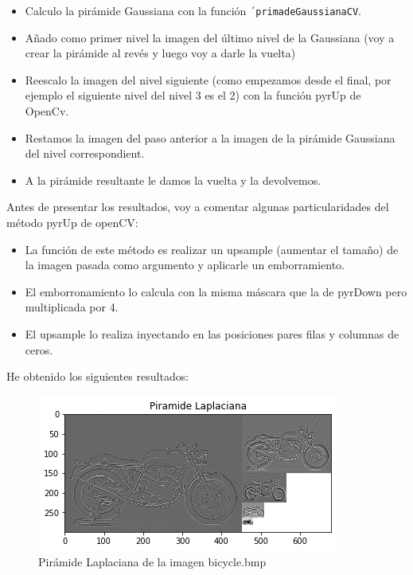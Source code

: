 \documentclass[12pt,spanish]{article}
\begin{document}
\begin{itemize}
	\item Calculo la pirámide Gaussiana con la función \texttt{´primadeGaussianaCV}.
	\item Añado como primer nivel la imagen del último nivel de la Gaussiana (voy a crear la pirámide al revés y luego voy a darle la vuelta)
	\item Reescalo la imagen del nivel siguiente (como empezamos desde el final, por ejemplo el siguiente nivel del nivel 3 es el 2) con la función pyrUp de OpenCv.
	\item Restamos la imagen del paso anterior a la imagen de la pirámide Gaussiana del nivel correspondient.
	\item A la pirámide resultante le damos la vuelta y la devolvemos.
\end{itemize}

Antes de presentar los resultados, voy a comentar algunas particularidades del método pyrUp de openCV:

\begin{itemize}
	\item La función de este método es realizar un upsample (aumentar el tamaño) de la imagen pasada como argumento y aplicarle un emborramiento.
	\item El emborronamiento lo calcula con la misma máscara que la de pyrDown pero multiplicada por 4.
	\item El upsample lo realiza inyectando en las posiciones pares filas y columnas de ceros.
\end{itemize}


He obtenido los siguientes resultados:

\begin{figure}[H]
	\includegraphics[width=\textwidth]{./imagenes_memoria/pir_lapla.png}
	\caption {Pirámide Laplaciana de la imagen bicycle.bmp}
	\label{pir_lapla}
\end{figure}
\end{document}
